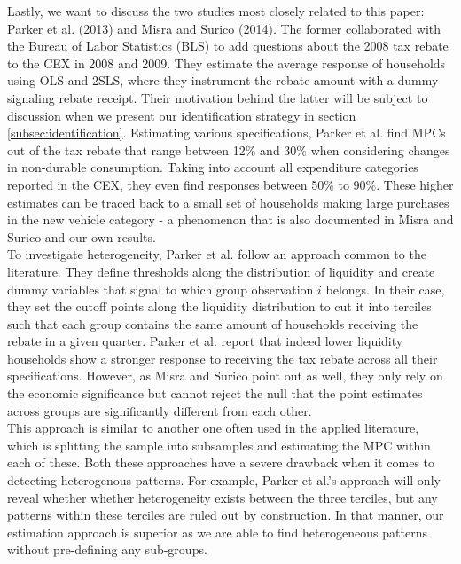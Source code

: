 Lastly, we want to discuss the two studies most closely related to this paper: Parker et al. (2013) and Misra and Surico (2014). The former collaborated with the Bureau of Labor Statistics (BLS) to add questions about the 2008 tax rebate to the CEX in 2008 and 2009. They estimate the average response of households using OLS and 2SLS, where they instrument the rebate amount with a dummy signaling rebate receipt. Their motivation behind the latter will be subject to discussion when we present our identification strategy in section \ref{subsec:identification}. Estimating various specifications, Parker et al. find MPCs out of the tax rebate that range between 12\% and 30\% when considering changes in non-durable consumption. Taking into account all expenditure categories reported in the CEX, they even find responses between 50\% to 90\%. These higher estimates can be traced back to a small set of households making large purchases in the new vehicle category - a phenomenon that is also documented in Misra and Surico and our own results. \\
To investigate heterogeneity, Parker et al. follow an approach common to the literature. They define thresholds along the distribution of liquidity and create dummy variables that signal to which group observation $i$ belongs. In their case, they set the cutoff points along the liquidity distribution to cut it into terciles such that each group contains the same amount of households receiving the rebate in a given quarter. Parker et al. report that indeed lower liquidity households show a stronger response to receiving the tax rebate across all their specifications. However, as Misra and Surico point out as well, they only rely on the economic significance but cannot reject the null that the point estimates across groups are significantly different from each other. \\
This approach is similar to another one often used in the applied literature, which is splitting the sample into subsamples and estimating the MPC within each of these. Both these approaches have a severe drawback when it comes to detecting heterogenous patterns. For example, Parker et al.'s approach will only reveal whether whether heterogeneity exists between the three terciles, but any patterns within these terciles are ruled out by construction. In that manner, our estimation approach is superior as we are able to find heterogeneous patterns without pre-defining any sub-groups. \\
